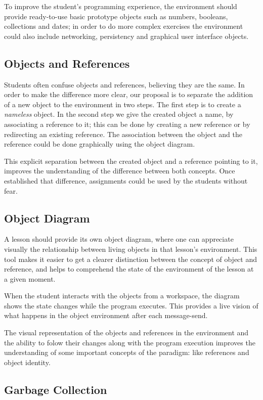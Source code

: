 \documentclass{sigplanconf}
\begin{document}
To improve the student’s programming experience, the environment should provide ready-to-use basic prototype objects such as numbers, booleans, collections and dates; in order to do more complex exercises the environment could also include networking, persistency and graphical user interface objects.

\subsection{Objects and References}
Students often confuse objects and references, believing they are the same. In order to make the difference more clear, our proposal is to separate the addition of a new object to the environment in two steps. The first step is to create a \textit{nameless} object. In the second step we give the created object a name, by associating a reference to it; this can be done by creating a new reference or by redirecting an existing reference. The association between the object and the reference could be done graphically using the object diagram. 

This explicit separation between the created object and a reference pointing to it, improves the understanding of the difference between both concepts. Once established that difference, assignments could be used by the students without fear.

\subsection{Object Diagram}

A lesson should provide its own object diagram, where one can appreciate
visually the relationship between living objects in that lesson’s environment.
This tool makes it easier to get a clearer distinction between the concept of object and reference, and helps to comprehend the state of the environment of the lesson at a given moment. 

When the student interacts with the objects from a workspace, the diagram shows the state changes while the program executes. This provides a live vision of what happens in the object environment after each message-send. 

The visual representation of the objects and references in the environment and the ability to folow their changes along with the program execution improves the understanding of some important concepts of the paradigm: like references and object identity.

\subsection{Garbage Collection}
\end{document}
